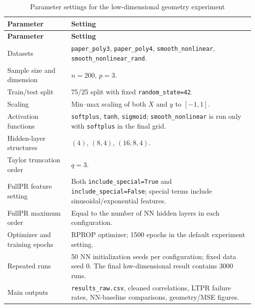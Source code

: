 \documentclass[UTF8,a4paper,11pt]{ctexart}
\begin{document}
\begin{longtable}{L{0.30\textwidth}L{0.58\textwidth}}
\caption{Parameter settings for the low-dimensional geometry experiment}
\label{tab:lowdim-parameters} \\
\toprule
\textbf{Parameter} & \textbf{Setting} \\
\midrule
\endfirsthead
\toprule
\textbf{Parameter} & \textbf{Setting} \\
\midrule
\endhead
\bottomrule
\endlastfoot

Datasets
& \texttt{paper\_poly3}, \texttt{paper\_poly4}, \texttt{smooth\_nonlinear}, \texttt{smooth\_nonlinear\_rand}. \\

Sample size and dimension
& $n=200$, $p=3$. \\

Train/test split
& 75/25 split with fixed \texttt{random\_state=42}. \\

Scaling
& Min--max scaling of both $X$ and $y$ to $[-1,1]$. \\

Activation functions
& \texttt{softplus}, \texttt{tanh}, \texttt{sigmoid}; \texttt{smooth\_nonlinear} is run only with \texttt{softplus} in the final grid. \\

Hidden-layer structures
& $(4)$, $(8,4)$, $(16,8,4)$. \\

Taylor truncation order
& $q=3$. \\

FullPR feature setting
& Both \texttt{include\_special=True} and \texttt{include\_special=False}; special terms include sinusoidal/exponential features. \\

FullPR maximum order
& Equal to the number of NN hidden layers in each configuration. \\

Optimizer and training epochs
& RPROP optimizer; 1500 epochs in the default experiment setting. \\

Repeated runs
& 50 NN initialization seeds per configuration; fixed data seed 0. The final low-dimensional result contains 3000 runs. \\

Main outputs
& \texttt{results\_raw.csv}, cleaned correlations, LTPR failure rates, NN-baseline comparisons, geometry/MSE figures. \\

\end{longtable}
\end{document}
